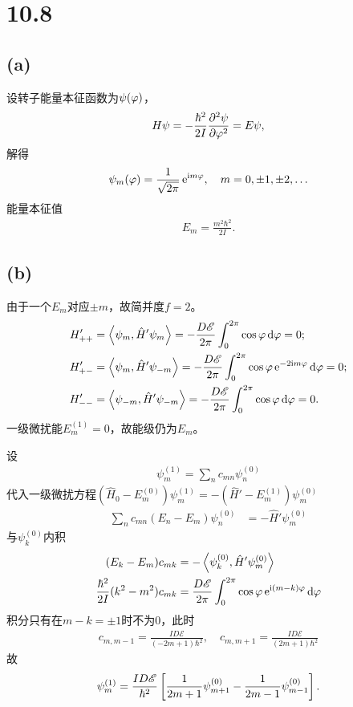 	\section{10.8}
	\subsection*{(a)}
	设转子能量本征函数为$\psi(\vf)$，
	\begin{align}
		H\psi=-\frac{\hbar^2}{2I}\pv[2]\psi\vf=E\psi,
	\end{align}
	解得
	\begin{align}
		\psi_m(\vf)=\frac1{\sqrt{2\pi}}\e{\i m\vf},\quad m=0,\pm 1,\pm 2,\ldots
	\end{align}
	能量本征值 
	\begin{align}
		E_m=\frac{m^2\hbar^2}{2I}.
	\end{align}
	\subsection*{(b)}
	由于一个$E_m$对应$\pm m$，故简并度$f=2$。
	\begin{align}
		H_{++}'&=\inp{\psi_m}{\hat H'\psi_m}=-\frac{D\mathscr E}{2\pi}\int_0^{2\pi}\cos\vf\d\vf=0;\\
		H_{+-}'&=\inp{\psi_m}{\hat H'\psi_{-m}}=-\frac{D\mathscr E}{2\pi}\int_0^{2\pi}\cos\vf\e{-2\i m\vf}\d\vf=0;\\
		H_{--}'&=\inp{\psi_{-m}}{\hat H'\psi_{-m}}=-\frac{D\mathscr E}{2\pi}\int_0^{2\pi}\cos\vf\d\vf=0.
	\end{align}
	一级微扰能$E_m^{(1)}=0$，故能级仍为$E_m$。

	设
	\begin{align}
		\psi_m^{(1)}=\sum_nc_{mn}\psi_n^{(0)}
	\end{align}
	代入一级微扰方程$(\hat H_0-E_m^{(0)})\psi_m^{(1)}=-(\hat H'-E_m^{(1)})\psi_m^{(0)}$
	\begin{align}
		\sum_nc_{mn}(E_n-E_m)\psi_n^{(0)}&=-\hat H'\psi_m^{(0)}
	\end{align}
	与$\psi_k^{(0)}$内积
	\begin{align}\notag
		(E_k-E_m)c_{mk}&=-\inp{\psi_k^{(0)}}{\hat H'\psi_m^{(0)}}\\
		\frac{\hbar^2}{2I}(k^2-m^2)c_{mk}&=\frac{D\mathscr E}{2\pi}\int_0^{2\pi}\cos\vf\e{\i(m-k)\vf}\d\vf
	\end{align}
	积分只有在$m-k=\pm 1$时不为0，此时
	\begin{align}
		c_{m,m-1}=\frac{ID\mathscr E}{(-2m+1)\hbar^2},\quad c_{m,m+1}=\frac{ID\mathscr E}{(2m+1)\hbar^2}
	\end{align}
	故
	\begin{align}
		\psi_m^{(1)}=\frac{ID\mathscr E}{\hbar^2}\fkh{\frac1{2m+1}\psi_{m+1}^{(0)}-\frac1{2m-1}\psi_{m-1}^{(0)}}.
	\end{align}
